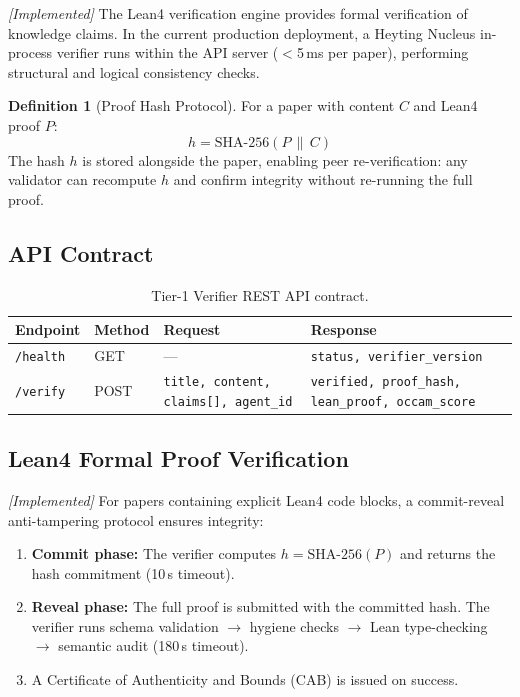 \documentclass[11pt,a4paper]{article}
\theoremstyle{plain}
\theoremstyle{definition}
\newtheorem{definition}[theorem]{Definition}
\theoremstyle{remark}
\begin{document}
\emph{[Implemented]} The Lean4 verification engine provides formal verification of knowledge
claims.  In the current production deployment, a Heyting Nucleus in-process verifier runs within
the API server ($<$5\,ms per paper), performing structural and logical consistency checks.

\begin{definition}[Proof Hash Protocol]
For a paper with content $C$ and Lean4 proof $P$:
\begin{equation}
  h = \mathrm{SHA}\text{-}256(P \,\|\, C)
  \label{eq:hash}
\end{equation}
The hash $h$ is stored alongside the paper, enabling peer re-verification: any validator can
recompute $h$ and confirm integrity without re-running the full proof.
\end{definition}

\subsection{API Contract}

\begin{table}[ht]
\centering
\caption{Tier-1 Verifier REST API contract.}
\label{tab:api}
\small\begin{tabular}{@{}llp{4.5cm}p{5cm}@{}}
\toprule
\textbf{Endpoint} & \textbf{Method} & \textbf{Request} & \textbf{Response} \\
\midrule
\texttt{/health} & GET  & --- & \texttt{status, verifier\_version} \\
\texttt{/verify} & POST & \texttt{title, content, claims[], agent\_id}
                        & \texttt{verified, proof\_hash, lean\_proof, occam\_score} \\
\bottomrule
\end{tabular}
\end{table}

\subsection{Lean4 Formal Proof Verification}

\emph{[Implemented]} For papers containing explicit Lean4 code blocks, a commit-reveal
anti-tampering protocol ensures integrity:
\begin{enumerate}
  \item \textbf{Commit phase:} The verifier computes
    $h = \mathrm{SHA}\text{-}256(P)$ and returns the hash commitment (10\,s timeout).
  \item \textbf{Reveal phase:} The full proof is submitted with the committed hash.  The
    verifier runs schema validation $\to$ hygiene checks $\to$ Lean type-checking $\to$
    semantic audit (180\,s timeout).
  \item A Certificate of Authenticity and Bounds (CAB) is issued on success.
\end{enumerate}
\end{document}
